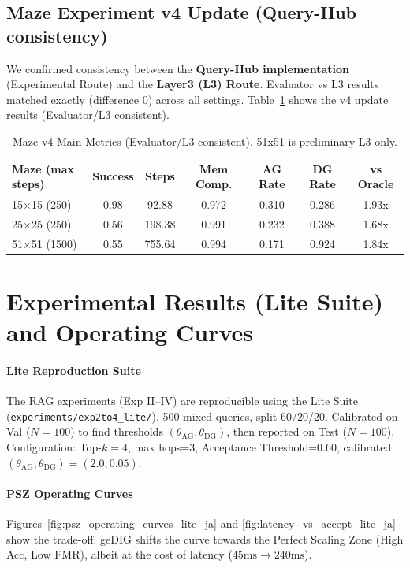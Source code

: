 \documentclass[12pt]{article}
\begin{document}
\subsection{Maze Experiment v4 Update (Query-Hub consistency)}\label{sec:maze_v4_update}
We confirmed consistency between the \textbf{Query-Hub implementation} (Experimental Route) and the \textbf{Layer3 (L3) Route}.
Evaluator vs L3 results matched exactly (difference 0) across all settings.
Table~\ref{tab:maze_v4_main} shows the v4 update results (Evaluator/L3 consistent).
\begin{table}[H]
    \centering
    \caption{Maze v4 Main Metrics (Evaluator/L3 consistent). 51x51 is preliminary L3-only.}
    \label{tab:maze_v4_main}
    \small
    \begin{tabular}{lcccccc}
    \toprule
    Maze (max steps) & Success & Steps & Mem Comp. & AG Rate & DG Rate & vs Oracle \\
    \midrule
    15$\times$15 (250) & 0.98 & 92.88 & 0.972 & 0.310 & 0.286 & 1.93x \\
    25$\times$25 (250) & 0.56 & 198.38 & 0.991 & 0.232 & 0.388 & 1.68x \\
    51$\times$51 (1500) & 0.55 & 755.64 & 0.994 & 0.171 & 0.924 & 1.84x \\
    \bottomrule
    \end{tabular}
\end{table}

\section{Experimental Results (Lite Suite) and Operating Curves}\label{sec:exp_results_lite}
\paragraph{Lite Reproduction Suite}\; The RAG experiments (Exp II--IV) are reproducible using the Lite Suite (\texttt{experiments/exp2to4\_lite/}).
500 mixed queries, split 60/20/20. Calibrated on Val ($N=100$) to find thresholds $(\theta_{\mathrm{AG}},\theta_{\mathrm{DG}})$, then reported on Test ($N=100$).
Configuration: Top-$k=4$, max hops=3, Acceptance Threshold=0.60, calibrated $(\theta_{\mathrm{AG}},\theta_{\mathrm{DG}})=(2.0, 0.05)$.

\paragraph{PSZ Operating Curves}\;
Figures~\ref{fig:psz_operating_curves_lite_ja} and \ref{fig:latency_vs_accept_lite_ja} show the trade-off.
geDIG shifts the curve towards the Perfect Scaling Zone (High Acc, Low FMR), albeit at the cost of latency ($45\mathrm{ms} \to 240\mathrm{ms}$).
\end{document}
